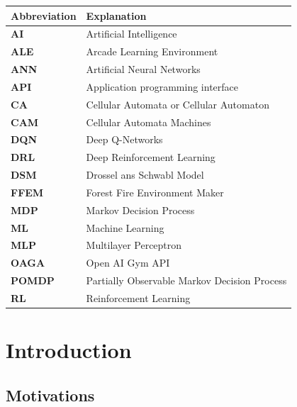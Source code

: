 \documentclass[
  12pt,
  openany]{book}
\begin{document}
\begin{tabular}{>{\bfseries}ll}
\toprule
Abbreviation & Explanation\\
\midrule
AI & Artificial Intelligence\\
ALE & Arcade Learning Environment\\
ANN & Artificial Neural Networks\\
API & Application programming interface\\
CA & Cellular Automata or Cellular Automaton\\
\addlinespace
CAM & Cellular Automata Machines\\
DQN & Deep Q-Networks\\
DRL & Deep Reinforcement Learning\\
DSM & Drossel ans Schwabl Model\\
FFEM & Forest Fire Environment Maker\\
\addlinespace
MDP & Markov Decision Process\\
ML & Machine Learning\\
MLP & Multilayer Perceptron\\
OAGA & Open AI Gym API\\
POMDP & Partially Observable Markov Decision Process\\
\addlinespace
RL & Reinforcement Learning\\
\bottomrule
\end{tabular}

\hypertarget{introduction}{%
\chapter{Introduction}\label{introduction}}

\hypertarget{motivations}{%
\section{Motivations}\label{motivations}}
\end{document}
